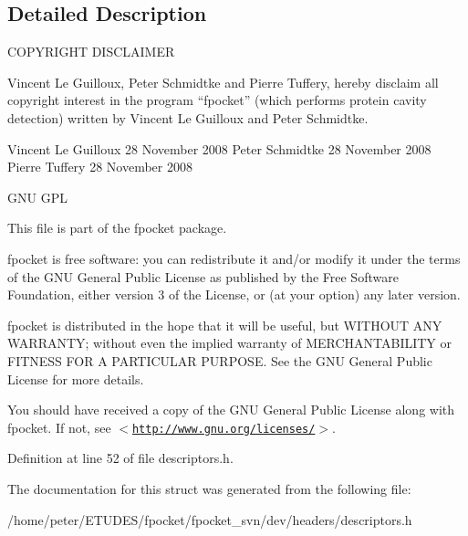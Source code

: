 \subsection{Detailed Description}
COPYRIGHT DISCLAIMER

Vincent Le Guilloux, Peter Schmidtke and Pierre Tuffery, hereby disclaim all copyright interest in the program “fpocket” (which performs protein cavity detection) written by Vincent Le Guilloux and Peter Schmidtke.

Vincent Le Guilloux 28 November 2008 Peter Schmidtke 28 November 2008 Pierre Tuffery 28 November 2008

GNU GPL

This file is part of the fpocket package.

fpocket is free software: you can redistribute it and/or modify it under the terms of the GNU General Public License as published by the Free Software Foundation, either version 3 of the License, or (at your option) any later version.

fpocket is distributed in the hope that it will be useful, but WITHOUT ANY WARRANTY; without even the implied warranty of MERCHANTABILITY or FITNESS FOR A PARTICULAR PURPOSE. See the GNU General Public License for more details.

You should have received a copy of the GNU General Public License along with fpocket. If not, see $<$\href{http://www.gnu.org/licenses/}{\tt http://www.gnu.org/licenses/}$>$. 

Definition at line 52 of file descriptors.h.

The documentation for this struct was generated from the following file:\begin{CompactItemize}
\item 
/home/peter/ETUDES/fpocket/fpocket\_\-svn/dev/headers/descriptors.h\end{CompactItemize}
